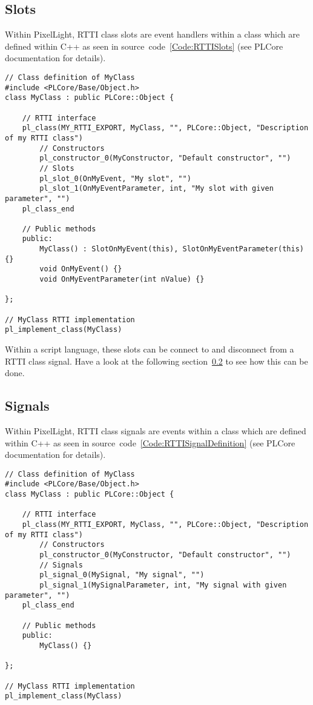 \subsection{Slots}
\label{Script_RTTIObjects_Slots}
Within PixelLight, \ac{RTTI} class slots are event handlers within a class which are defined within C++ as seen in source~code~\ref{Code:RTTISlots} (see PLCore documentation for details).
\begin{lstlisting}[label=Code:RTTISlots,caption={Definition of \ac{RTTI} class slots with parameters (C++)}]
// Class definition of MyClass
#include <PLCore/Base/Object.h>
class MyClass : public PLCore::Object {

	// RTTI interface
	pl_class(MY_RTTI_EXPORT, MyClass, "", PLCore::Object, "Description of my RTTI class")
		// Constructors
		pl_constructor_0(MyConstructor, "Default constructor", "")
		// Slots
		pl_slot_0(OnMyEvent, "My slot", "")
		pl_slot_1(OnMyEventParameter, int, "My slot with given parameter", "")
	pl_class_end

	// Public methods
	public:
		MyClass() : SlotOnMyEvent(this), SlotOnMyEventParameter(this) {}
		void OnMyEvent() {}
		void OnMyEventParameter(int nValue) {}

};

// MyClass RTTI implementation
pl_implement_class(MyClass)
\end{lstlisting}

Within a script language, these slots can be connect to and disconnect from a \ac{RTTI} class signal. Have a look at the following section~\ref{Script_RTTIObjects_Signals} to see how this can be done.


\subsection{Signals}
\label{Script_RTTIObjects_Signals}
Within PixelLight, \ac{RTTI} class signals are events within a class which are defined within C++ as seen in source~code~\ref{Code:RTTISignalDefinition} (see PLCore documentation for details).
\begin{lstlisting}[label=Code:RTTISignalDefinition,caption={Defining a \ac{RTTI} class with signals (C++)}]
// Class definition of MyClass
#include <PLCore/Base/Object.h>
class MyClass : public PLCore::Object {

	// RTTI interface
	pl_class(MY_RTTI_EXPORT, MyClass, "", PLCore::Object, "Description of my RTTI class")
		// Constructors
		pl_constructor_0(MyConstructor, "Default constructor", "")
		// Signals
		pl_signal_0(MySignal, "My signal", "")
		pl_signal_1(MySignalParameter, int, "My signal with given parameter", "")
	pl_class_end

	// Public methods
	public:
		MyClass() {}

};

// MyClass RTTI implementation
pl_implement_class(MyClass)
\end{lstlisting}

